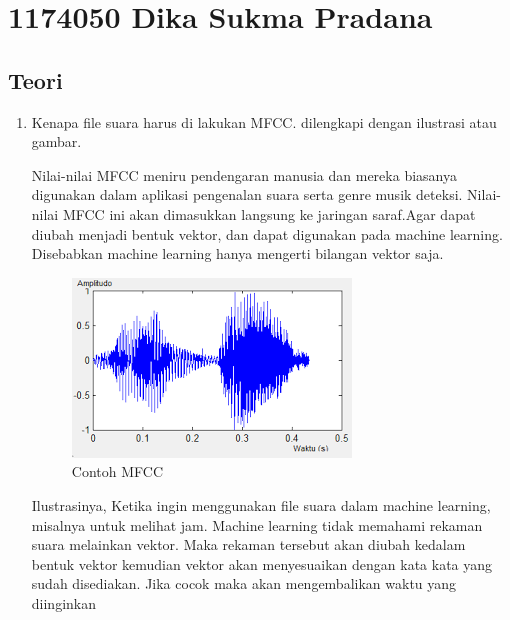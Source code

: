 \section{1174050 Dika Sukma Pradana}
\subsection{Teori}
\begin{enumerate}
\item Kenapa file suara harus di lakukan MFCC. dilengkapi dengan ilustrasi atau gambar. \\
\par Nilai-nilai MFCC meniru pendengaran manusia dan mereka biasanya digunakan dalam aplikasi pengenalan suara serta genre musik
deteksi. Nilai-nilai MFCC ini akan dimasukkan langsung ke jaringan saraf.Agar dapat diubah menjadi bentuk vektor, dan dapat digunakan pada machine learning. Disebabkan machine learning hanya mengerti bilangan vektor saja.\\
\begin{figure}[ht]
\centering
\includegraphics[scale=0.5]{figures/1174050/chapter6/7.png}
\caption{Contoh MFCC}
\label{Teori}
\end{figure}
Ilustrasinya, Ketika ingin menggunakan file suara dalam machine learning, misalnya untuk melihat jam. Machine learning tidak memahami rekaman suara melainkan vektor. Maka rekaman tersebut akan diubah kedalam bentuk vektor kemudian vektor akan menyesuaikan dengan kata kata yang sudah disediakan. Jika cocok maka akan mengembalikan waktu yang diinginkan


\end{enumerate}
